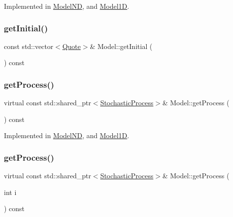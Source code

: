 Implemented in \hyperlink{class_model_n_d_ab2356536a38f4961257654de629d6093}{Model\+ND}, and \hyperlink{class_model1_d_ac81875523be6153cb58d0f37914eb9a1}{Model1D}.

\hypertarget{class_model_ade5d08aae4d32777bfa048f356bbcca9}{}\label{class_model_ade5d08aae4d32777bfa048f356bbcca9} 
\subsubsection{\texorpdfstring{get\+Initial()}{getInitial()}}
{\footnotesize\ttfamily const std\+::vector$<$\hyperlink{_name_def_8h_a642a6c5fd87319d922637de0e0bb0305}{Quote}$>$\& Model\+::get\+Initial (\begin{DoxyParamCaption}{ }\end{DoxyParamCaption}) const\hspace{0.3cm}{\ttfamily [inline]}}

\hypertarget{class_model_adc6a695d3f6b2def79f2dde69b3ab547}{}\label{class_model_adc6a695d3f6b2def79f2dde69b3ab547} 
\subsubsection{\texorpdfstring{get\+Process()}{getProcess()}\hspace{0.1cm}{\footnotesize\ttfamily [1/2]}}
{\footnotesize\ttfamily virtual const std\+::shared\+\_\+ptr$<$\hyperlink{class_stochastic_process}{Stochastic\+Process}$>$\& Model\+::get\+Process (\begin{DoxyParamCaption}{ }\end{DoxyParamCaption}) const\hspace{0.3cm}{\ttfamily [pure virtual]}}



Implemented in \hyperlink{class_model_n_d_a98976fe73a8895ff98ba60ea174232f8}{Model\+ND}, and \hyperlink{class_model1_d_ae3cdfcb2922f03a68b8e8e02d572746f}{Model1D}.

\hypertarget{class_model_a23adaaf21b2955a1f4d4893ad9b77f02}{}\label{class_model_a23adaaf21b2955a1f4d4893ad9b77f02} 
\subsubsection{\texorpdfstring{get\+Process()}{getProcess()}\hspace{0.1cm}{\footnotesize\ttfamily [2/2]}}
{\footnotesize\ttfamily virtual const std\+::shared\+\_\+ptr$<$\hyperlink{class_stochastic_process}{Stochastic\+Process}$>$\& Model\+::get\+Process (\begin{DoxyParamCaption}\item[{int}]{i }\end{DoxyParamCaption}) const\hspace{0.3cm}{\ttfamily [pure virtual]}}



